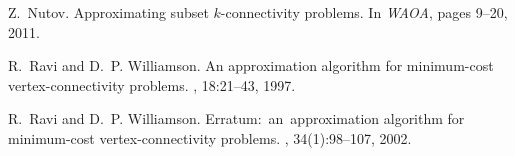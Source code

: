 \begin{thebibliography}{10}
Z.~Nutov.
\newblock Approximating subset $k$-connectivity problems.
\newblock In {\em WAOA}, pages 9--20, 2011.

R.~Ravi and D.~P. Williamson.
\newblock An approximation algorithm for minimum-cost vertex-connectivity
  problems.
, 18:21--43, 1997.

R.~Ravi and D.~P. Williamson.
\newblock Erratum:~an~approxi\-mation algorithm for minimum-cost
  vertex-connectivity problems.
, 34(1):98--107, 2002.

\end{thebibliography}




